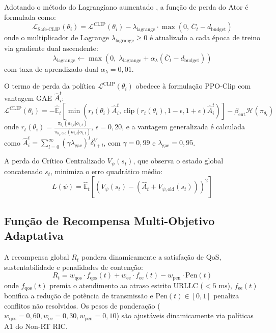 \documentclass[12pt]{article}
\begin{document}
Adotando o método do Lagrangiano aumentado \cite{stooke2020responsive, achiam2017cpo}, a função de perda do Ator é formulada como:
\begin{equation}
\mathcal{L}_{\text{Safe-CLIP}}(\theta_i) = \mathcal{L}^{\text{CLIP}}(\theta_i) - \lambda_{\text{lagrange}} \cdot \max\left(0, \, \overline{C}_t - d_{\text{budget}}\right)
\end{equation}
onde o multiplicador de Lagrange $\lambda_{\text{lagrange}} \ge 0$ é atualizado a cada época de treino via gradiente dual ascendente:
\begin{equation}
\lambda_{\text{lagrange}} \leftarrow \max\left(0, \; \lambda_{\text{lagrange}} + \alpha_\lambda (\overline{C}_t - d_{\text{budget}})\right)
\end{equation}
com taxa de aprendizado dual $\alpha_\lambda = 0,01$.

O termo de perda da política $\mathcal{L}^{\text{CLIP}}(\theta_i)$ obedece à formulação PPO-Clip com vantagem GAE $\hat{A}_i^t$:
\begin{equation}
\mathcal{L}^{\text{CLIP}}(\theta_i) = -\hat{\mathbb{E}}_t \left[ \min \left( r_t(\theta_i) \hat{A}_i^t, \, \text{clip}\left(r_t(\theta_i), 1-\epsilon, 1+\epsilon\right) \hat{A}_i^t \right) \right] - \beta_{\text{ent}} \mathcal{H}(\pi_{\theta_i})
\end{equation}
onde $r_t(\theta_i) = \frac{\pi_{\theta_i}(a_{i,t}|o_{i,t})}{\pi_{\theta_i,\text{old}}(a_{i,t}|o_{i,t})}$, $\epsilon = 0,20$, e a vantagem generalizada é calculada como $\hat{A}_i^t = \sum_{l=0}^\infty (\gamma \lambda_{\text{gae}})^l \delta_{t+l}^V$, com $\gamma = 0,99$ e $\lambda_{\text{gae}} = 0,95$.

A perda do Crítico Centralizado $V_\psi(s_t)$, que observa o estado global concatenado $s_t$, minimiza o erro quadrático médio:
\begin{equation}
L(\psi) = \hat{\mathbb{E}}_t \left[ \left( V_\psi(s_t) - (\hat{A}_t + V_{\psi,\text{old}}(s_t)) \right)^2 \right]
\end{equation}

\subsection{Função de Recompensa Multi-Objetivo Adaptativa}

A recompensa global $R_t$ pondera dinamicamente a satisfação de QoS, sustentabilidade e penalidades de contenção:
\begin{equation}
R_t = w_{\text{qos}} \cdot f_{\text{qos}}(t) + w_{\text{ee}} \cdot f_{\text{ee}}(t) - w_{\text{pen}} \cdot \text{Pen}(t)
\end{equation}
onde $f_{\text{qos}}(t)$ premia o atendimento ao atraso estrito URLLC ($<5\text{ ms}$), $f_{\text{ee}}(t)$ bonifica a redução de potência de transmissão e $\text{Pen}(t) \in [0, 1]$ penaliza conflitos não resolvidos. Os pesos de ponderação ($w_{\text{qos}}=0,60, w_{\text{ee}}=0,30, w_{\text{pen}}=0,10$) são ajustáveis dinamicamente via políticas A1 do Non-RT RIC.
\end{document}
